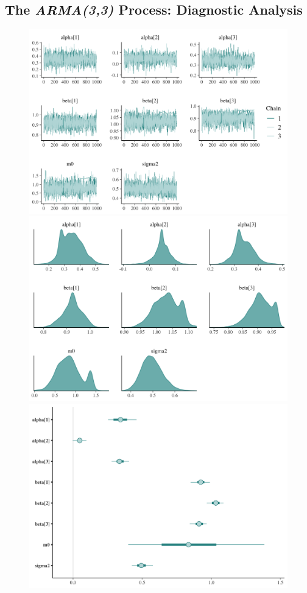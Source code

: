 \documentclass{Configuration_Files/PoliMi3i_thesis}
\begin{document}
\subsection{The \textbf{\textit{ARMA(3,3)}} Process: Diagnostic Analysis}
\begin{figure}[H]
    \centering
    \includegraphics[width=0.62\linewidth]{ARMA-trace.png}
    \vspace{0.5em}
    
    \includegraphics[width=0.62\linewidth]{ARMA-density.png}
    \vspace{0.5em}
    
    \includegraphics[width=0.62\linewidth]{ARMA-interval.png}
\end{figure}
\end{document}
